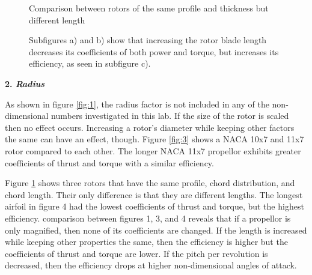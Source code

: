 \documentclass{article}
\begin{document}
\begin{figure}
  \centering
  \caption{Comparison between rotors of the same profile and thickness but different length}
  \captionsetup{aboveskip=0pt,font=it}
  \caption*{Subfigures a) and b) show that increasing the rotor blade length decreases its coefficients of both power and torque, but increases its efficiency, as seen in subfigure c).}
  \label{fig:4}
\end{figure}

\textbf{2. \emph{Radius}} \newline

As shown in figure \ref{fig:1}, the radius factor is not included in any of the non-dimensional numbers investigated in this lab. If the size of the rotor is scaled then no effect occurs. Increasing a rotor's diameter while keeping other factors the same can have an effect, though. Figure \ref{fig:3} shows a NACA 10x7 and 11x7 rotor compared to each other. The longer NACA 11x7 propellor exhibits greater coefficients of thrust and torque with a similar efficiency. \newline

Figure \ref{fig:4} shows three rotors that have the same profile, chord distribution, and chord length. Their only difference is that they are different lengths. The longest airfoil in figure 4 had the lowest coefficients of thrust and torque, but the highest efficiency. comparison between figures 1, 3, and 4 reveals that if a propellor is only magnified, then none of its coefficients are changed. If the length is increased while keeping other properties the same, then the efficiency is higher but the coefficients of thrust and torque are lower. If the pitch per revolution is decreased, then the efficiency drops at higher non-dimensional angles of attack. 
\end{document}
